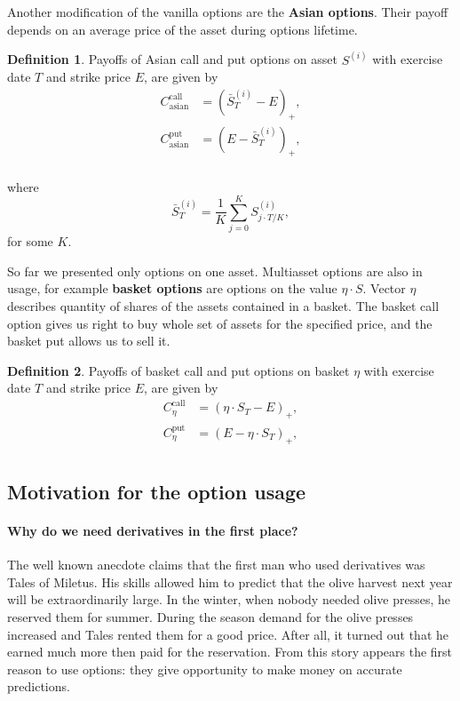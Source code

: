 \documentclass[a4paper,11pt, twoside]{book}
\theoremstyle{definition}
\newtheorem{mydef}{Definition}[chapter]
\theoremstyle{remark}
\begin{document}
Another modification of the vanilla options are the \textbf{Asian options}. Their payoff depends on an average price of the asset during options lifetime.
\begin{mydef}
 Payoffs of Asian call and put options on asset $S^{(i)}$ with exercise date $T$ and strike price $E$, are given by
\begin{align*}
 C^{\text{call}}_{\text{asian}} &= (\bar{S}^{(i)}_T - E)_+, \\
 C^{\text{put}}_{\text{asian}} &= (E - \bar{S}^{(i)}_T)_+, \\
\end{align*}
\end{mydef}
\noindent where
\[ \bar{S}^{(i)}_T = \frac{1}{K} \sum\limits_{j=0}^K S^{(i)}_{j\cdot T/K}, \]
for some $K$. 

So far we presented only options on one asset. Multiasset options are also in usage, for example \textbf{basket options} are options on the value $\eta \cdot S$. Vector $\eta$ describes quantity of shares of the assets contained in a basket. The basket call option gives us right to buy whole set of assets for the specified price, and the basket put allows us to sell it.
\begin{mydef}
 Payoffs of basket call and put options on basket $\eta$ with exercise date $T$ and strike price $E$, are given by
\begin{align*}
 C^{\text{call}}_{\eta} &= (\eta \cdot S_T - E)_+, \\
 C^{\text{put}}_{\eta} &= (E - \eta \cdot S_T)_+, \\
\end{align*}
\end{mydef}

\subsection{Motivation for the option usage}

\paragraph{Why do we need derivatives in the first place?}
The well known anecdote claims that the first man who used derivatives was Tales of Miletus. His skills allowed him to predict that the olive harvest next year will be extraordinarily large. In the winter, when nobody needed olive presses, he reserved them for summer. During the season demand for the olive presses increased and Tales rented them for a good price. After all, it turned out that he earned much more then paid for the reservation. From this story appears the first reason to use options: they give opportunity to make money on accurate predictions.
\end{document}
